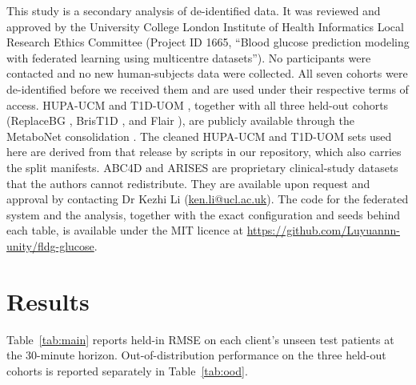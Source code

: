 \documentclass[10pt,letterpaper]{article}
\begin{document}
This study is a secondary analysis of de-identified data. It was reviewed and
approved by the University College London Institute of Health Informatics Local
Research Ethics Committee (Project ID 1665, ``Blood glucose prediction modeling
with federated learning using multicentre datasets''). No participants were
contacted and no new human-subjects data were collected. All seven cohorts were
de-identified before we received them and are used under their respective terms
of access. HUPA-UCM \cite{hidalgo2024hupaucm} and T1D-UOM
\cite{alsuhaymi2025t1duom}, together with all three held-out cohorts
(ReplaceBG \cite{aleppo2017replacebg}, BrisT1D \cite{james2025brist1d}, and Flair
\cite{jaeb_flair}), are publicly available through the MetaboNet consolidation
\cite{wolff2026metabonet}. The cleaned HUPA-UCM and T1D-UOM sets used here are
derived from that release by scripts in our repository, which also carries the
split manifests. ABC4D \cite{abc4d_nct} and ARISES
\cite{zhu2022arises} are proprietary clinical-study datasets that the authors
cannot redistribute. They are available upon request and approval by contacting
Dr Kezhi Li (\href{mailto:ken.li@ucl.ac.uk}{ken.li@ucl.ac.uk}). The code for the
federated system and the analysis, together with the exact configuration and
seeds behind each table, is available under the MIT licence at
\url{https://github.com/Luyuannn-unity/fldg-glucose}.

\section*{Results}

Table~\ref{tab:main} reports held-in RMSE on each client's unseen test patients at
the 30-minute horizon. Out-of-distribution performance on
the three held-out cohorts is reported separately in Table~\ref{tab:ood}.
\end{document}

